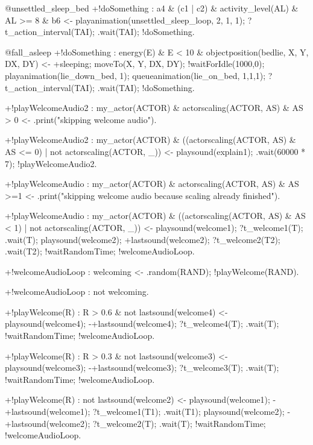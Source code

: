 \documentclass[draft,final]{vutinfth} %
\begin{document}
{@unsettled\_sleep\_bed
+!doSomething : a4 \& (c1 | c2) \& activity\_level(AL) \& AL >= 8 \& b6
    <-  playanimation(unsettled\_sleep\_loop, 2, 1, 1);
        ?t\_action\_interval(TAI);
        .wait(TAI);
        !doSomething.

@fall\_asleep
+!doSomething : energy(E) \& E < 10 \& objectposition(bedlie, X, Y, DX, DY)
    <-  +sleeping;
        moveTo(X, Y, DX, DY);
        !waitForIdle(1000,0);
        playanimation(lie\_down\_bed, 1);
        queueanimation(lie\_on\_bed, 1,1,1);
        ?t\_action\_interval(TAI);
        .wait(TAI);
        !doSomething.

+!playWelcomeAudio2 : my\_actor(ACTOR) \& actorscaling(ACTOR, AS) \& AS > 0
    <-  .print("skipping welcome audio").

+!playWelcomeAudio2 : my\_actor(ACTOR) \& ((actorscaling(ACTOR, AS) \& AS <= 0) | not actorscaling(ACTOR, \_))
    <-  playsound(explain1);
        .wait(60000 * 7);
        !playWelcomeAudio2.

+!playWelcomeAudio : my\_actor(ACTOR) \& actorscaling(ACTOR, AS) \& AS >=1
    <-  .print("skipping welcome audio because scaling already finished").

+!playWelcomeAudio : my\_actor(ACTOR) \& ((actorscaling(ACTOR, AS) \& AS < 1) | not actorscaling(ACTOR, \_))
    <-  playsound(welcome1);
        ?t\_welcome1(T);
        .wait(T);
        playsound(welcome2);
        +lastsound(welcome2);
        ?t\_welcome2(T2);
        .wait(T2);
        !waitRandomTime;
        !welcomeAudioLoop.

+!welcomeAudioLoop : welcoming
    <-  .random(RAND);
        !playWelcome(RAND).

+!welcomeAudioLoop : not welcoming.

+!playWelcome(R) : R > 0.6 \& not lastsound(welcome4)
    <-  playsound(welcome4);
        -+lastsound(welcome4);
        ?t\_welcome4(T);
        .wait(T);
        !waitRandomTime;
        !welcomeAudioLoop.

+!playWelcome(R) : R > 0.3 \& not lastsound(welcome3)
    <-  playsound(welcome3);
        -+lastsound(welcome3);
        ?t\_welcome3(T);
        .wait(T);
        !waitRandomTime;
        !welcomeAudioLoop.

+!playWelcome(R) : not lastsound(welcome2)
    <-  playsound(welcome1);
        -+lastsound(welcome1);
        ?t\_welcome1(T1);
        .wait(T1);
        playsound(welcome2);
        -+lastsound(welcome2);
        ?t\_welcome2(T);
        .wait(T);
        !waitRandomTime;
        !welcomeAudioLoop.

}
\end{document}

